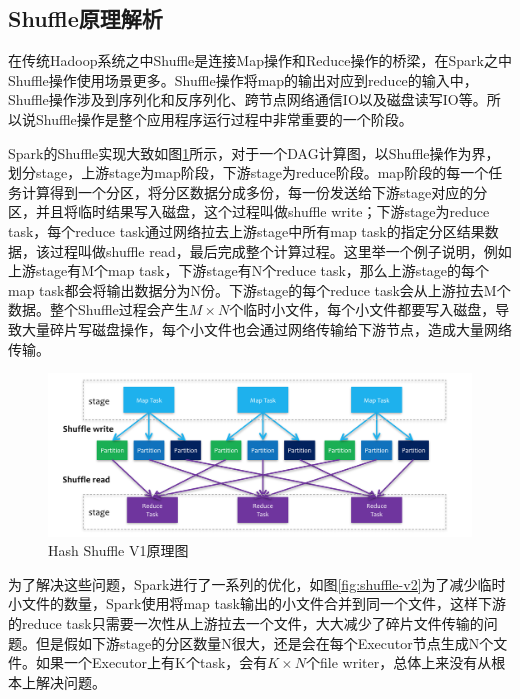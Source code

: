 \subsection{Shuffle原理解析}

在传统Hadoop系统之中Shuffle是连接Map操作和Reduce操作的桥梁，在Spark之中Shuffle操作使用场景更多。Shuffle操作将map的输出对应到reduce的输入中，Shuffle操作涉及到序列化和反序列化、跨节点网络通信IO以及磁盘读写IO等。所以说Shuffle操作是整个应用程序运行过程中非常重要的一个阶段。

Spark的Shuffle实现大致如图\ref{fig:shuffle-overview}所示，对于一个DAG计算图，以Shuffle操作为界，划分stage，上游stage为map阶段，下游stage为reduce阶段。map阶段的每一个任务计算得到一个分区，将分区数据分成多份，每一份发送给下游stage对应的分区，并且将临时结果写入磁盘，这个过程叫做shuffle write；下游stage为reduce task，每个reduce task通过网络拉去上游stage中所有map task的指定分区结果数据，该过程叫做shuffle read，最后完成整个计算过程。这里举一个例子说明，例如上游stage有M个map task，下游stage有N个reduce task，那么上游stage的每个map task都会将输出数据分为N份。下游stage的每个reduce task会从上游拉去M个数据。整个Shuffle过程会产生$M \times N$个临时小文件，每个小文件都要写入磁盘，导致大量碎片写磁盘操作，每个小文件也会通过网络传输给下游节点，造成大量网络传输。

\begin{figure}[htbp]
    \centering
    \includegraphics[width=1\textwidth]{Img/spark-shuffle-overview.png}
    \caption{Hash Shuffle V1原理图}
    \label{fig:shuffle-overview}
\end{figure}

为了解决这些问题，Spark进行了一系列的优化，如图\ref{fig:shuffle-v2}为了减少临时小文件的数量，Spark使用将map task输出的小文件合并到同一个文件，这样下游的reduce task只需要一次性从上游拉去一个文件，大大减少了碎片文件传输的问题。但是假如下游stage的分区数量N很大，还是会在每个Executor节点生成N个文件。如果一个Executor上有K个task，会有$K \times N$个file writer，总体上来没有从根本上解决问题。


